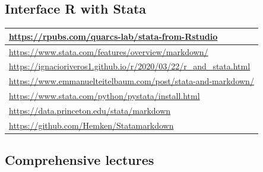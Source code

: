 \documentclass[
  letterpaper,
  DIV=11,
  numbers=noendperiod,
  oneside]{scrreprt}
\begin{document}
\hypertarget{interface-r-with-stata}{%
\subsection{Interface R with Stata}\label{interface-r-with-stata}}

\begin{longtable}[]{@{}l@{}}
\toprule()
\url{https://rpubs.com/quarcs-lab/stata-from-Rstudio} \\
\midrule()
\endhead
\url{https://www.stata.com/features/overview/markdown/} \\
\url{https://ignacioriveros1.github.io/r/2020/03/22/r_and_stata.html} \\
\url{https://www.emmanuelteitelbaum.com/post/stata-and-markdown/} \\
\url{https://www.stata.com/python/pystata/install.html} \\
\url{https://data.princeton.edu/stata/markdown} \\
\url{https://github.com/Hemken/Statamarkdown} \\
\bottomrule()
\end{longtable}

\hypertarget{comprehensive-lectures}{%
\subsection{Comprehensive lectures}\label{comprehensive-lectures}}
\end{document}
